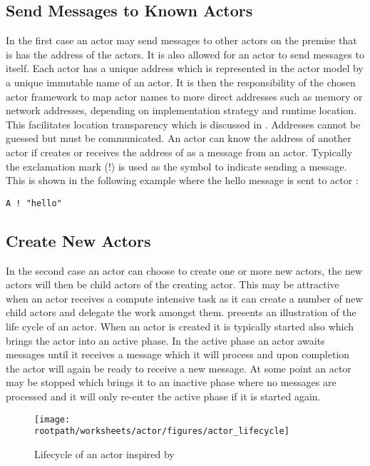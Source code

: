 \subsection{Send Messages to Known Actors}
In the first case an actor may send messages to other actors on the premise that is has the address of the actors. It is also allowed for an actor to send messages to itself. Each actor has a unique address which is represented in the actor model by a unique immutable name of an actor\cite[p. 2]{karmani2009actor}. It is then the responsibility of the chosen actor framework to map actor names to more direct addresses such as memory or network addresses, depending on implementation strategy and runtime location\cite[p. 3]{hewitt2014actor}. This facilitates location transparency which is discussed in . Addresses cannot be guessed but must be communicated. An actor  can know the address of another actor  if  creates  or receives the address of  as a message from an actor. Typically the exclamation mark (!) is used as the symbol to indicate sending a message. This is shown in the following example where the hello message is sent to actor :
\begin{verbatim}
A ! "hello"
\end{verbatim}

\subsection{Create New Actors}
In the second case an actor can choose to create one or more new actors, the new actors will then be child actors of the creating actor. This may be attractive when an actor receives a compute intensive task as it can create a number of new child actors and delegate the work amongst them.  presents an illustration of the life cycle of an actor. When an actor is created it is typically started also which brings the actor into an active phase. In the active phase an actor awaits messages until it receives a message which it will process and upon completion the actor will again be ready to receive a new message. At some point an actor may be stopped which brings it to an inactive phase where no messages are processed and it will only re-enter the active phase if it is started again.

\begin{figure}[ht!]
\centering
\texttt{[image: \\rootpath/worksheets/actor/figures/actor\_lifecycle]}
\caption{Lifecycle of an actor inspired by \cite[Figure 12]{subramaniam2011programming}}\label{fig:actor_lifecycle}
\end{figure}
